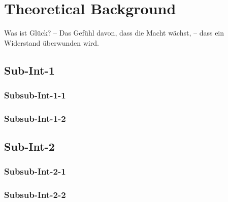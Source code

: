 \chapter{Theoretical Background}%
\label{chap:theoBackground}%
\TUMchaptertableofcontents%
Was ist Glück? -- Das Gefühl davon, dass die Macht wächst, -- dass ein Widerstand überwunden wird.
\section{Sub-Int-1}%
\label{sec:theoBackground:Sub-Int-1}%
\subsection{Subsub-Int-1-1}%
\label{subsec:theoBackground:Sub-Int-1:Subsub-Int-1-1}%
\subsection{Subsub-Int-1-2}%
\label{subsec:theoBackground:Sub-Int-1:Subsub-Int-1-2}%
\section{Sub-Int-2}%
\label{sec:theoBackground:Sub-Int-2}%
\subsection{Subsub-Int-2-1}%
\label{subsec:theoBackground:Sub-Int-2:Subsub-Int-2-1}%
\subsection{Subsub-Int-2-2}%
\label{subsec:theoBackground:Sub-Int-2:Subsub-Int-2-2}%